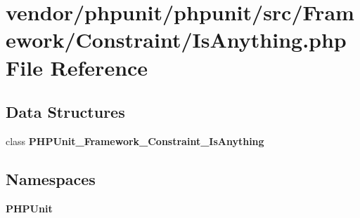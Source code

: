 \section{vendor/phpunit/phpunit/src/\+Framework/\+Constraint/\+Is\+Anything.php File Reference}
\label{_is_anything_8php}
\subsection*{Data Structures}
\begin{DoxyCompactItemize}
\item 
class {\bf P\+H\+P\+Unit\+\_\+\+Framework\+\_\+\+Constraint\+\_\+\+Is\+Anything}
\end{DoxyCompactItemize}
\subsection*{Namespaces}
\begin{DoxyCompactItemize}
\item 
 {\bf P\+H\+P\+Unit}
\end{DoxyCompactItemize}
